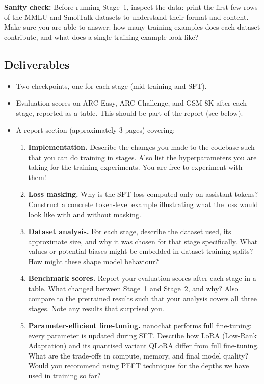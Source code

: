 \textbf{Sanity check:} Before running Stage~1, inspect the data: print the first few rows of the MMLU and SmolTalk datasets to understand their format and content. Make sure you are able to answer: how many training examples does each dataset contribute, and what does a single training example look like?

\subsection{Deliverables}

\begin{itemize}
    \item Two checkpoints, one for each stage (mid-training and SFT).
    \item Evaluation scores on ARC-Easy, ARC-Challenge, and GSM-8K after each stage, reported as a table. This should be part of the report (see below).
    \item A report section (approximately 3 pages) covering:
          \begin{enumerate}
              \item \textbf{Implementation.} Describe the changes you made to the codebase such that you can do training in stages. Also list the hyperparameters you are taking for the training experiments. You are free to experiment with them!
              \item \textbf{Loss masking.} Why is the SFT loss computed only on assistant tokens?  Construct a concrete token-level example illustrating what the loss would look like with and without masking.
              \item \textbf{Dataset analysis.} For each stage, describe the dataset used, its approximate size, and why it was chosen for that stage specifically.  What values or potential biases might be embedded in dataset training splits?  How might these shape model behaviour?
              \item \textbf{Benchmark scores.} Report your evaluation scores after each stage in a table. What changed between Stage~1 and Stage~2, and why? Also compare to the pretrained results such that your analysis covers all three stages. Note any results that surprised you.
              \item \textbf{Parameter-efficient fine-tuning.}  nanochat performs full fine-tuning: every parameter is updated during SFT. Describe how LoRA (Low-Rank Adaptation) and its quantised variant QLoRA differ from full fine-tuning. What are the trade-offs in compute, memory, and final model quality? Would you recommend using PEFT techniques for the depths we have used in training so far?
          \end{enumerate}
\end{itemize}

